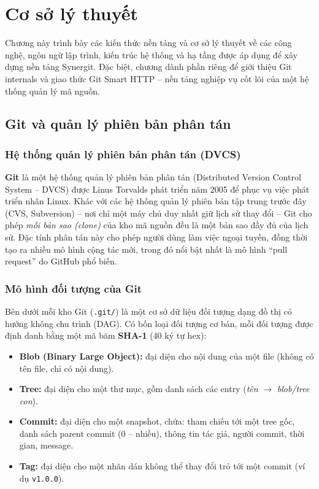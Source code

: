 \chapter{Cơ sở lý thuyết}

Chương này trình bày các kiến thức nền tảng và cơ sở lý thuyết về các công nghệ, ngôn ngữ lập trình, kiến trúc hệ thống và hạ tầng được áp dụng để xây dựng nền tảng Synergit. Đặc biệt, chương dành phần riêng để giới thiệu Git internals và giao thức Git Smart HTTP -- nền tảng nghiệp vụ cốt lõi của một hệ thống quản lý mã nguồn.

\section{Git và quản lý phiên bản phân tán}

\subsection{Hệ thống quản lý phiên bản phân tán (DVCS)}
\textbf{Git} là một hệ thống quản lý phiên bản phân tán (Distributed Version Control System -- DVCS) được Linus Torvalds phát triển năm 2005 để phục vụ việc phát triển nhân Linux. Khác với các hệ thống quản lý phiên bản tập trung trước đây (CVS, Subversion) -- nơi chỉ một máy chủ duy nhất giữ lịch sử thay đổi -- Git cho phép \textit{mỗi bản sao (clone)} của kho mã nguồn đều là một bản sao đầy đủ của lịch sử. Đặc tính phân tán này cho phép người dùng làm việc ngoại tuyến, đồng thời tạo ra nhiều mô hình cộng tác mới, trong đó nổi bật nhất là mô hình ``pull request'' do GitHub phổ biến.

\subsection{Mô hình đối tượng của Git}
Bên dưới mỗi kho Git (\texttt{.git/}) là một cơ sở dữ liệu đối tượng dạng đồ thị có hướng không chu trình (DAG). Có bốn loại đối tượng cơ bản, mỗi đối tượng được định danh bằng một mã băm \textbf{SHA-1} (40 ký tự hex):

\begin{itemize}
\item \textbf{Blob (Binary Large Object):} đại diện cho nội dung của một file (không có tên file, chỉ có nội dung).
\item \textbf{Tree:} đại diện cho một thư mục, gồm danh sách các entry (\textit{tên} $\to$ \textit{blob/tree con}).
\item \textbf{Commit:} đại diện cho một snapshot, chứa: tham chiếu tới một tree gốc, danh sách parent commit (0 -- nhiều), thông tin tác giả, người commit, thời gian, message.
\item \textbf{Tag:} đại diện cho một nhãn dán không thể thay đổi trỏ tới một commit (ví dụ \texttt{v1.0.0}).
\end{itemize}

